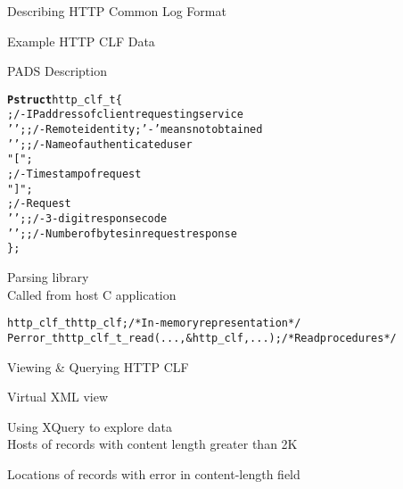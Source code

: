 \documentclass[landscape]{slides}
\newcommand{\bftt}[1]{{\ttfamily\bfseries{}#1}}
\newcommand{\kw}[1]{{\bftt{#1}}}
\begin{document}
\begin{Slide}{Describing HTTP Common Log Format}

  \bb Example HTTP CLF Data

{\small
\begin{alltt}
\end{alltt}
}
  \bb PADS Description

{\small
\begin{alltt}
\kw{Pstruct} http_clf_t \{
         ;              /- IP address of client requesting service
   ' ';  ;          /- Remote identity; '-' means not obtained
   ' ';  ;              /- Name of authenticated user
   " [";
   \darkgreen{Pdate(:']':)} ;             /- Timestamp of request
   "] ";
    ;           /- Request
   ' ';   ;   /- 3-digit response code
   ' ';   ; /- Number of bytes in request response
\};
\end{alltt}}

\bb Parsing library \\
\bbb Called from host C application

{\small
\begin{alltt}
  http_clf_t http_clf;        /* In-memory representation */
  Perror_t http_clf_t_read(..., &http_clf, ...); /* Read procedures */
\end{alltt}}


\end{Slide}

\begin{Slide}{Viewing \& Querying HTTP CLF}

  \bb Virtual XML view 
{\small
\begin{alltt}
\end{alltt}
}

\bb Using XQuery to explore data\\
\bbb Hosts of records with content length greater than 2K

{\small
\begin{alltt}
\end{alltt}}

\bbb Locations of records with error in content-length field

{\small
\begin{alltt}
\end{alltt}}
\end{Slide}
\end{document}
